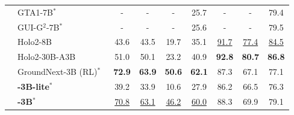 \begin{table}[!t]
{\begin{tabular}{clcccc|ccc}
    &GTA1-7B$^*$~\citep{yang2025gta1}&- &-  &  -   &  25.7 &-  &  -    & 79.4 \\
    &GUI-G$^2$-7B$^*$~\citep{tang2025gui} &- &-  &  -   &  25.6 &-  &  -    & 79.5 \\
    &Holo2-8B~\citep{hcompany2025holo2} & 43.6 & 43.5 & 19.7 & 35.1 & \underline{91.7}   &\underline{77.4} &   \underline{84.5}\\
    &Holo2-30B-A3B~\citep{hcompany2025holo2}& 51.0 & 50.1 & 23.2 & 40.9&\bf92.8&\bf\bf80.7 &\bf86.8 \\
    &GroundNext-3B (RL)$^*$~\citep{feizi2025grounding}&\bf72.9 &\bf63.9 &\bf50.6& \bf62.1 &87.3&67.1&77.1\\
    \midrule
    & \textbf{\method{}-3B-lite}$^*$ &39.2 & 33.9 & 10.6 & 27.9 &86.2  &66.5 & 76.3 \\
    & \textbf{\method{}-3B}$^*$ & \underline{70.8}& \underline{63.1}& \underline{46.2} & \underline{60.0}&88.3  &69.9 &  79.1  \\     
    \bottomrule
    \end{tabular}}
    \label{tab:ui_mm}
\end{table}